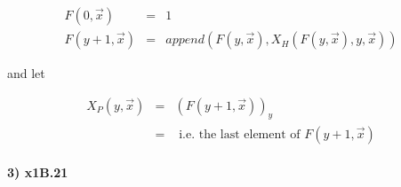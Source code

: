 \documentclass{article}
\begin{document}
\[
\begin{array}{rcl}
  F(0, \overrightarrow{x}) & = & 1 \\
  F(y+1, \overrightarrow{x}) & = & append(F(y,\overrightarrow{x}), X_H(F(y,\overrightarrow{x}), y, \overrightarrow{x}))
\end{array}
\]

and let

\[
\begin{array}{rcl}
  X_P(y, \overrightarrow{x}) & = & (F(y+1,\overrightarrow{x}))_y \\
  & = & \text{ i.e. the last element of } F(y+1,\overrightarrow{x})
\end{array} 
\]



\paragraph{3) x1B.21}
\end{document}

